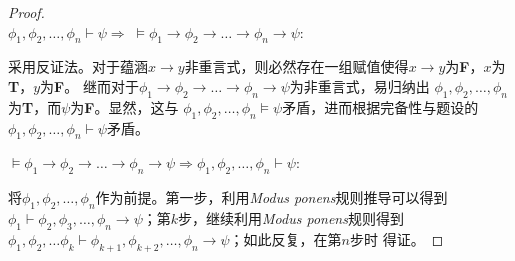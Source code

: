 \begin{proof}~\\
    $\phi_1,\phi_2,\ldots,\phi_n \vdash \psi \Rightarrow\; \models \phi_1\rightarrow\phi_2\rightarrow\ldots\rightarrow\phi_n\rightarrow\psi$:

    采用反证法。对于蕴涵$x\rightarrow y$非重言式，则必然存在一组赋值使得$x\rightarrow y$为\textbf{F}，$x$为\textbf{T}，$y$为\textbf{F}。
    继而对于$\phi_1\rightarrow\phi_2\rightarrow\ldots\rightarrow\phi_n\rightarrow\psi$为非重言式，易归纳出
    $\phi_1,\phi_2,\ldots,\phi_n$为\textbf{T}，而$\psi$为\textbf{F}。显然，这与
    $\phi_1,\phi_2,\ldots,\phi_n \models \psi$矛盾，进而根据完备性与题设的$\phi_1,\phi_2,\ldots,\phi_n \vdash \psi$矛盾。

    $\models\phi_1\rightarrow\phi_2\rightarrow\ldots\rightarrow\phi_n\rightarrow\psi \Rightarrow\phi_1,\phi_2,\ldots,\phi_n\vdash\psi$:

    将$\phi_1,\phi_2,\ldots,\phi_n$作为前提。第一步，利用\textit{Modus ponens}规则推导可以得到
    $\phi_1\vdash \phi_2,\phi_3,\ldots,\phi_n \rightarrow \psi$；第$k$步，继续利用\textit{Modus ponens}规则得到
    $\phi_1,\phi_2,\ldots\phi_k\vdash \phi_{k+1},\phi_{k+2},\ldots,\phi_n \rightarrow \psi$；如此反复，在第$n$步时
    得证。
\end{proof}
